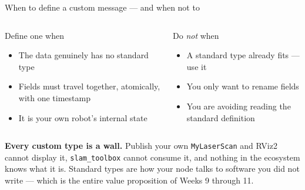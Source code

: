 \documentclass[aspectratio=169]{beamer}
\begin{document}
\begin{frame}{When to define a custom message --- and when not to}
  \small
  \begin{columns}[T,onlytextwidth]
    \begin{block}{\small Define one when}
      \footnotesize
      \begin{itemize}
        \item The data genuinely has no standard type
        \item Fields must travel together, atomically, with one timestamp
        \item It is your own robot's internal state
      \end{itemize}
    \end{block}

    \begin{block}{\small Do \emph{not} when}
      \footnotesize
      \begin{itemize}
        \item A standard type already fits --- use it
        \item You only want to rename fields
        \item You are avoiding reading the standard definition
      \end{itemize}
    \end{block}
  \end{columns}

  \vspace{0.9em}
  \begin{inthefield}
    \footnotesize
    \textbf{Every custom type is a wall.} Publish your own \texttt{MyLaserScan} and RViz2 cannot
    display it, \texttt{slam\_toolbox} cannot consume it, and nothing in the ecosystem knows
    what it is. Standard types are how your node talks to software you did not write --- which
    is the entire value proposition of Weeks 9 through 11.
  \end{inthefield}
\end{frame}
\end{document}
